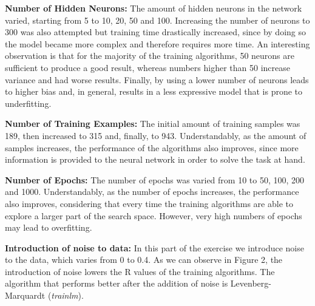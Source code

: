\documentclass[11pt,conference,compsoc]{IEEEtran}
\begin{document}
\textbf{Number of Hidden Neurons:} The amount of hidden neurons in the network varied, starting from 5 to 10, 20, 50 and 100. Increasing the number of neurons to 300 was also attempted but training time drastically increased, since by doing so the model became more complex and therefore requires more time. An interesting observation is that for the majority of the training algorithms, 50 neurons are sufficient to produce a good result, whereas numbers higher than 50 increase variance and had worse results. Finally, by using a lower number of neurons leads to higher bias and, in general, results in a less expressive model that is prone to underfitting.

\textbf{Number of Training Examples:} The initial amount of training samples was 189, then increased to 315 and, finally, to 943. Understandably, as the amount of samples increases, the performance of the algorithms also improves, since more information is provided to the neural network in order to solve the task at hand.

\textbf{Number of Epochs:} The number of epochs was varied from 10 to 50, 100, 200 and 1000. Understandably, as the number of epochs increases, the performance also improves, considering that every time the training algorithms are able to explore a larger part of the search space. However, very high numbers of epochs may lead to overfitting. 

\textbf{Introduction of noise to data:} In this part of the exercise we introduce noise to the data, which varies from 0 to 0.4. As we can observe in Figure 2, the introduction of noise lowers the R values of the training algorithms. The algorithm that performs better after the addition of noise is Levenberg-Marquardt (\textit{trainlm}). 
\end{document}
